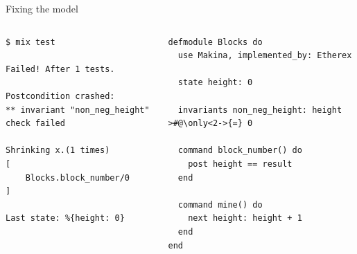 \documentclass[aspectratio=169, 10pt, handout]{beamer}
\begin{document}
\begin{frame}[label={sec:org7ca0fae},fragile]{Fixing the model}
 \begin{columns}
\begin{column}{0.48\columnwidth}
\onslide<+->
\lstset{language=bash,label= ,caption= ,captionpos=b,numbers=none,style=shell}
\begin{lstlisting}
$ mix test

Failed! After 1 tests.

Postcondition crashed:
** invariant "non_neg_height" check failed

Shrinking x.(1 times)
[
    Blocks.block_number/0
]

Last state: %{height: 0}
\end{lstlisting}
\end{column}

\begin{column}{0.48\columnwidth}
\lstset{language=elixir,label= ,caption= ,captionpos=b,numbers=none,style=display}
\begin{lstlisting}
defmodule Blocks do
  use Makina, implemented_by: Etherex

  state height: 0

  invariants non_neg_height: height >#@\only<2->{=} 0

  command block_number() do
    post height == result
  end

  command mine() do
    next height: height + 1
  end
end
\end{lstlisting}
\end{column}
\end{columns}
\end{frame}
\end{document}
